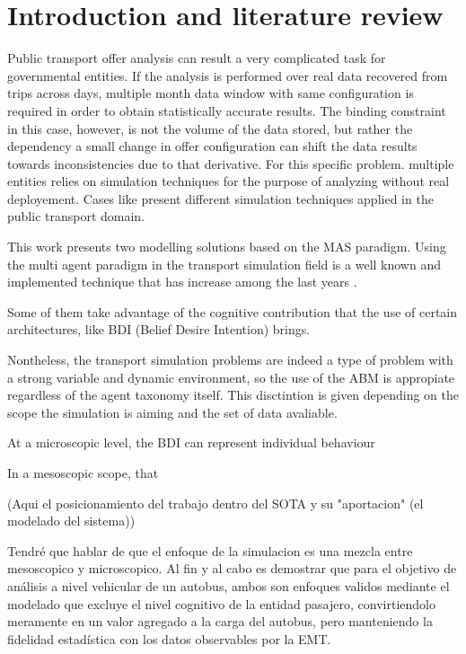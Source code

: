 \documentclass[a4paper,fleqn]{cas-sc}
\begin{document}
\section{Introduction and literature review}\label{}

Public transport offer analysis can result a very complicated task for governmental entities.
If the analysis is performed over real data recovered from trips across days, multiple month data window
with same configuration is required in order to obtain statistically accurate results. The binding constraint
in this case, however, is not the volume of the data stored, but rather the dependency 
a small change in offer configuration can shift the data results towards inconsistencies due to that derivative.
For this specific problem. multiple entities relies on simulation techniques for the purpose of analyzing without
real deployement.
Cases like \cite{manser2020designing,sun2021transitgym,talusan2025dispatch} present different simulation
techniques applied in the public transport domain.

This work presents two modelling solutions based on the MAS paradigm.
Using the multi agent paradigm in the transport simulation field is a well known and implemented technique
that has increase among the last years \cite{huang2022overview}.

Some of them take advantage of the cognitive contribution that the use of certain architectures, like BDI
(Belief Desire Intention) brings.

Nontheless, the transport simulation problems 
are indeed a type of problem with a strong variable and dynamic environment, so the use of the ABM
is appropiate regardless of the agent taxonomy itself. This disctintion is given depending on 
the scope the simulation is aiming and the set of data avaliable.

At a microscopic level, the BDI can represent individual behaviour 


In a mesoscopic scope, that 



(Aqui el posicionamiento del trabajo dentro del SOTA y su "aportacion" (el modelado del sistema))


Tendré que hablar de que el enfoque de la simulacion es una mezcla entre mesoscopico y microscopico.
Al fin y al cabo es demostrar que para el objetivo de análisis a nivel vehicular de un autobus,
ambos son enfoques validos mediante el modelado que excluye el nivel cognitivo de la entidad
pasajero, convirtiendolo meramente en un valor agregado a la carga del autobus, pero manteniendo
la fidelidad estadística con los datos observables por la EMT.
\end{document}
